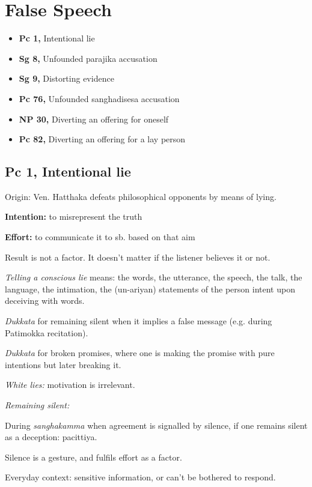 \chapter{False Speech}

\begin{itemize}
\tightlist
\item
  \textbf{Pc 1,} Intentional lie
\item
  \textbf{Sg 8,} Unfounded parajika accusation
\item
  \textbf{Sg 9,} Distorting evidence
\item
  \textbf{Pc 76,} Unfounded sanghadisesa accusation
\item
  \textbf{NP 30,} Diverting an offering for oneself
\item
  \textbf{Pc 82,} Diverting an offering for a lay person
\end{itemize}

\section{Pc 1, Intentional lie}

Origin: Ven. Hatthaka defeats philosophical opponents by means of lying.

\textbf{Intention:} to misrepresent the truth

\textbf{Effort:} to communicate it to sb. based on that aim

Result is not a factor. It doesn't matter if the listener believes it or
not.

\emph{Telling a conscious lie} means: the words, the utterance, the
speech, the talk, the language, the intimation, the (un-ariyan)
statements of the person intent upon deceiving with words.

\emph{Dukkata} for remaining silent when it implies a false message
(e.g. during Patimokka recitation).

\emph{Dukkata} for broken promises, where one is making the promise with
pure intentions but later breaking it.

\emph{White lies:} motivation is irrelevant.

\emph{Remaining silent:}

During \emph{sanghakamma} when agreement is signalled by silence, if one
remains silent as a deception: pacittiya.

Silence is a gesture, and fulfils effort as a factor.

Everyday context: sensitive information, or can't be bothered to
respond.

